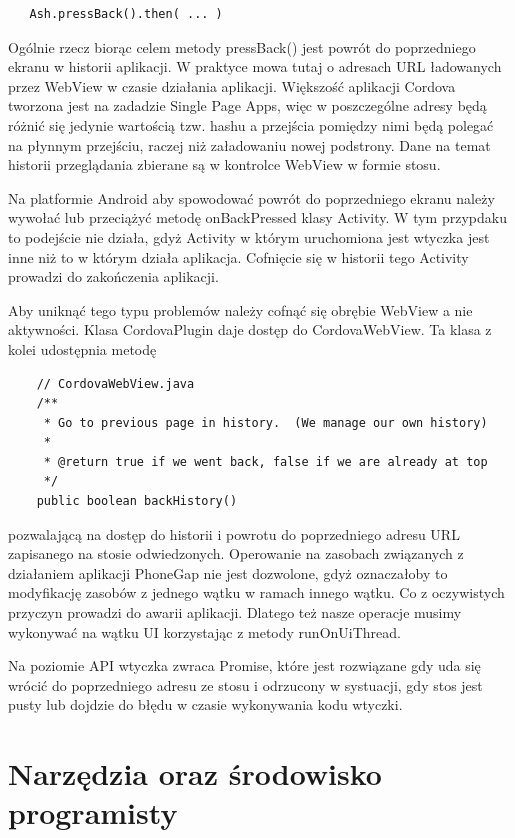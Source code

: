 \documentclass[brudnopis]{xmgr}
\begin{document}
\begin{lstlisting}
   Ash.pressBack().then( ... ) 
\end{lstlisting}

Ogólnie rzecz biorąc celem metody pressBack() jest powrót do poprzedniego ekranu w historii aplikacji. W praktyce mowa tutaj o adresach URL ładowanych przez WebView w czasie działania aplikacji. Większość aplikacji Cordova tworzona jest na zadadzie Single Page Apps, więc w poszczególne adresy będą różnić się jedynie wartością tzw. hashu a przejścia pomiędzy nimi będą polegać na płynnym przejściu, raczej niż załadowaniu nowej podstrony. Dane na temat historii przeglądania zbierane są w kontrolce WebView w formie stosu.

Na platformie Android aby spowodować powrót do poprzedniego ekranu należy wywołać lub przeciążyć metodę onBackPressed klasy Activity. W tym przypdaku to podejście nie działa, gdyż Activity w którym uruchomiona jest wtyczka jest inne niż to w którym działa aplikacja. Cofnięcie się w historii tego Activity prowadzi do zakończenia aplikacji. 

Aby uniknąć tego typu problemów należy cofnąć się obrębie WebView a nie aktywności. Klasa CordovaPlugin daje dostęp do CordovaWebView. Ta klasa z kolei udostępnia metodę 

\begin{lstlisting}
    // CordovaWebView.java
    /**
     * Go to previous page in history.  (We manage our own history)
     *
     * @return true if we went back, false if we are already at top
     */
    public boolean backHistory()
\end{lstlisting}

pozwalającą na dostęp do historii i powrotu do poprzedniego  adresu URL zapisanego na stosie odwiedzonych. Operowanie na zasobach związanych z działaniem aplikacji PhoneGap nie jest dozwolone, gdyż oznaczałoby to modyfikację zasobów z jednego wątku w ramach innego wątku. Co z oczywistych przyczyn prowadzi do awarii aplikacji. Dlatego też nasze operacje musimy wykonywać na wątku UI korzystając z metody runOnUiThread.

Na poziomie API wtyczka zwraca Promise, które jest rozwiązane gdy uda się wrócić do poprzedniego adresu ze stosu i odrzucony w systuacji, gdy stos jest pusty lub dojdzie do błędu w czasie wykonywania kodu wtyczki.

\chapter{Narzędzia oraz środowisko programisty}
\end{document}
